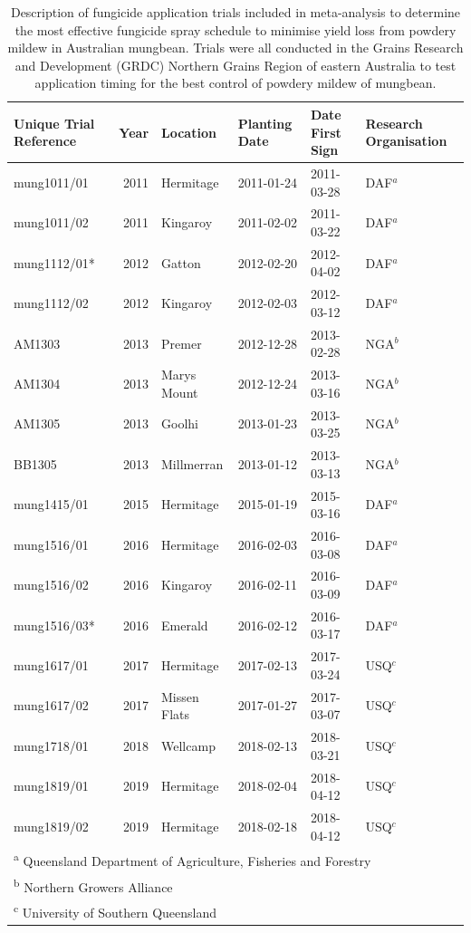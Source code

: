 \documentclass[agronomy,article,submit,moreauthors,pdftex]{mdpi}
\begin{document}
\begin{table}

\caption{\label{tab:Table1}Description of fungicide application trials included in meta-analysis to determine the most effective fungicide spray schedule to minimise yield loss from powdery mildew in Australian mungbean. Trials were all conducted in the Grains Research and Development (GRDC) Northern Grains Region of eastern Australia to test application timing for the best control of powdery mildew of mungbean.}
\centering
\begin{tabular}[t]{lrllll}
\toprule
Unique Trial Reference & Year & Location & Planting Date & Date First Sign & Research Organisation\\
\midrule
mung1011/01 & 2011 & Hermitage & 2011-01-24 & 2011-03-28 & DAF$^{a}$\\
mung1011/02 & 2011 & Kingaroy & 2011-02-02 & 2011-03-22 & DAF$^{a}$\\
mung1112/01* & 2012 & Gatton & 2012-02-20 & 2012-04-02 & DAF$^{a}$\\
mung1112/02 & 2012 & Kingaroy & 2012-02-03 & 2012-03-12 & DAF$^{a}$\\
AM1303 & 2013 & Premer & 2012-12-28 & 2013-02-28 & NGA$^{b}$\\
\addlinespace
AM1304 & 2013 & Marys Mount & 2012-12-24 & 2013-03-16 & NGA$^{b}$\\
AM1305 & 2013 & Goolhi & 2013-01-23 & 2013-03-25 & NGA$^{b}$\\
BB1305 & 2013 & Millmerran & 2013-01-12 & 2013-03-13 & NGA$^{b}$\\
mung1415/01 & 2015 & Hermitage & 2015-01-19 & 2015-03-16 & DAF$^{a}$\\
mung1516/01 & 2016 & Hermitage & 2016-02-03 & 2016-03-08 & DAF$^{a}$\\
\addlinespace
mung1516/02 & 2016 & Kingaroy & 2016-02-11 & 2016-03-09 & DAF$^{a}$\\
mung1516/03* & 2016 & Emerald & 2016-02-12 & 2016-03-17 & DAF$^{a}$\\
mung1617/01 & 2017 & Hermitage & 2017-02-13 & 2017-03-24 & USQ$^{c}$\\
mung1617/02 & 2017 & Missen Flats & 2017-01-27 & 2017-03-07 & USQ$^{c}$\\
mung1718/01 & 2018 & Wellcamp & 2018-02-13 & 2018-03-21 & USQ$^{c}$\\
\addlinespace
mung1819/01 & 2019 & Hermitage & 2018-02-04 & 2018-04-12 & USQ$^{c}$\\
mung1819/02 & 2019 & Hermitage & 2018-02-18 & 2018-04-12 & USQ$^{c}$\\
\bottomrule
\multicolumn{6}{l}{\textsuperscript{a} Queensland Department of Agriculture, Fisheries and Forestry}\\
\multicolumn{6}{l}{\textsuperscript{b} Northern Growers Alliance}\\
\multicolumn{6}{l}{\textsuperscript{c} University of Southern Queensland}\\
\end{tabular}
\end{table}
\end{document}
